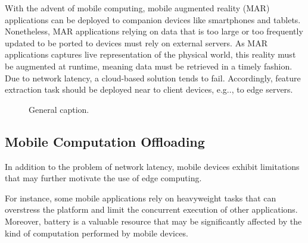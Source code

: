 With the advent of mobile computing,  mobile augmented reality (MAR) applications can be deployed to companion devices like smartphones and tablets. Nonetheless, MAR applications relying on data that is too large or too frequently updated to be ported to devices must rely on external servers. As MAR applications captures live representation of the physical world, this reality must be augmented at runtime, meaning data must be retrieved in a timely fashion. Due to network latency, a cloud-based solution tends to fail. Accordingly, feature extraction task should be deployed near to client devices, e.g.., to edge servers. 

\begin{figure}[htbp]
\centering
{}\hfill
{}\hfill

\caption{General caption.} \label{fig:1}
\end{figure}


\subsection{Mobile Computation Offloading}

In addition to the problem of network latency, mobile devices exhibit limitations that may further motivate the use of edge computing. 

For instance, some mobile applications rely on heavyweight tasks that can overstress the platform and limit the concurrent execution of other applications. Moreover, battery is a valuable resource that may be significantly affected by the kind of computation performed by mobile devices. 

